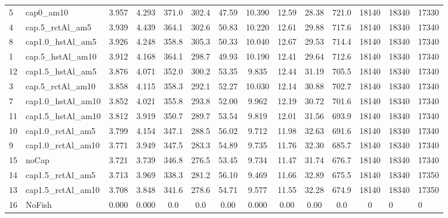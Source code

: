 \documentclass[11pt]{book}
\begin{document}
\begin{landscape}
\begin{longtable}[t]{llccccccccccll}
5 & cap0\_am10 & 3.957 & 4.293 & 371.0 & 302.4 & 47.59 & 10.390 & 12.59 & 28.38 & 721.0 & 18140 & 18340 & 17330\\
4 & cap.5\_rctAl\_am5 & 3.939 & 4.439 & 364.1 & 302.6 & 50.83 & 10.220 & 12.61 & 29.88 & 717.6 & 18140 & 18340 & 17340\\
8 & cap1.0\_hstAl\_am5 & 3.926 & 4.248 & 358.8 & 305.3 & 50.33 & 10.040 & 12.67 & 29.53 & 714.4 & 18140 & 18340 & 17340\\
1 & cap.5\_hstAl\_am10 & 3.912 & 4.168 & 364.1 & 298.7 & 49.93 & 10.190 & 12.41 & 29.64 & 712.6 & 18140 & 18340 & 17340\\
12 & cap1.5\_hstAl\_am5 & 3.876 & 4.071 & 352.0 & 300.2 & 53.35 & 9.835 & 12.44 & 31.19 & 705.5 & 18140 & 18340 & 17340\\
3 & cap.5\_rctAl\_am10 & 3.858 & 4.115 & 358.3 & 292.1 & 52.27 & 10.030 & 12.14 & 30.88 & 702.7 & 18140 & 18340 & 17340\\
7 & cap1.0\_hstAl\_am10 & 3.852 & 4.021 & 355.8 & 293.8 & 52.00 & 9.962 & 12.19 & 30.72 & 701.6 & 18140 & 18340 & 17340\\
11 & cap1.5\_hstAl\_am10 & 3.812 & 3.919 & 350.7 & 289.7 & 53.54 & 9.819 & 12.01 & 31.56 & 693.9 & 18140 & 18340 & 17340\\
10 & cap1.0\_rctAl\_am5 & 3.799 & 4.154 & 347.1 & 288.5 & 56.02 & 9.712 & 11.98 & 32.63 & 691.6 & 18140 & 18340 & 17340\\
9 & cap1.0\_rctAl\_am10 & 3.771 & 3.949 & 347.5 & 283.3 & 54.89 & 9.735 & 11.76 & 32.30 & 685.7 & 18140 & 18340 & 17340\\
15 & noCap & 3.721 & 3.739 & 346.8 & 276.5 & 53.45 & 9.734 & 11.47 & 31.74 & 676.7 & 18140 & 18340 & 17340\\
14 & cap1.5\_rctAl\_am5 & 3.713 & 3.969 & 338.3 & 281.2 & 56.10 & 9.469 & 11.66 & 32.89 & 675.5 & 18140 & 18340 & 17350\\
13 & cap1.5\_rctAl\_am10 & 3.708 & 3.848 & 341.6 & 278.6 & 54.71 & 9.577 & 11.55 & 32.28 & 674.9 & 18140 & 18340 & 17350\\
16 & NoFish & 0.000 & 0.000 & 0.0 & 0.0 & 0.00 & 0.000 & 0.00 & 0.00 & 0.0 & 0 & 0 & 0\\*
\end{longtable}
\endgroup{}
\end{landscape}
\endgroup{}

\newpage
\end{document}
